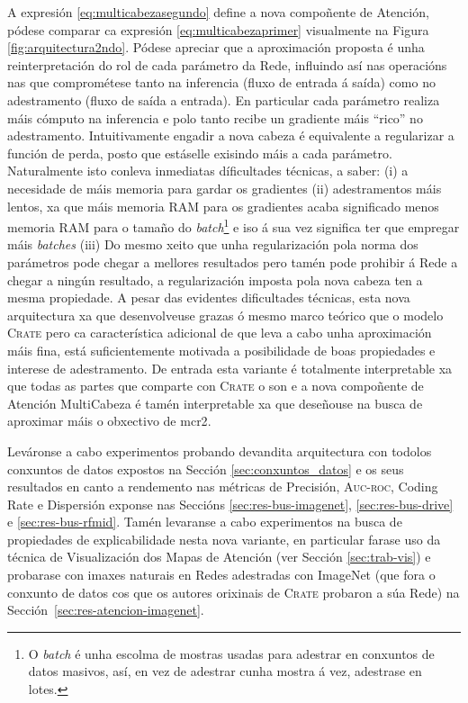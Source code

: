 A expresión \ref{eq:multicabezasegundo} define a nova compoñente de Atención, pódese comparar ca expresión \ref{eq:multicabezaprimer} visualmente na Figura \ref{fig:arquitectura2ndo}. Pódese apreciar que a aproximación proposta é unha reinterpretación do rol de cada parámetro da Rede, influindo así nas operacións nas que comprométese tanto na inferencia (fluxo de entrada á saída) como no adestramento (fluxo de saída a entrada). En particular cada parámetro realiza máis cómputo na inferencia e polo tanto recibe un gradiente máis ``rico'' no adestramento. Intuitivamente engadir a nova cabeza é equivalente a regularizar a función de perda, posto que estáselle exisindo máis a cada parámetro. Naturalmente isto conleva inmediatas díficultades técnicas, a saber: (i) a necesidade de máis memoria para gardar os gradientes (ii) adestramentos  máis lentos, xa que máis memoria RAM para os gradientes acaba significado menos memoria RAM para o tamaño do \emph{batch}\footnote{O \emph{batch} é unha escolma de mostras usadas para adestrar en conxuntos de datos masivos, así, en vez de adestrar cunha mostra á vez, adestrase en lotes.} e iso á sua vez significa ter que empregar máis \emph{batches} (iii) Do mesmo xeito que unha regularización pola norma dos parámetros pode chegar a mellores resultados pero tamén pode prohibir á Rede a chegar a ningún resultado, a regularización imposta pola nova cabeza ten a mesma propiedade. A pesar das evidentes dificultades técnicas, esta nova arquitectura xa que desenvolveuse grazas ó mesmo marco teórico que o modelo \textsc{Crate} pero ca característica adicional de que leva a cabo unha aproximación máis fina, está suficientemente motivada a posibilidade de boas propiedades e interese de adestramento. De entrada esta variante é totalmente interpretable xa que todas as partes que comparte con \textsc{Crate} o son e a nova compoñente de Atención MultiCabeza é tamén interpretable xa que deseñouse na busca de aproximar máis o obxectivo de \acrshort{mcr2}.

Leváronse a cabo experimentos probando devandita arquitectura con todolos conxuntos de datos expostos na Sección \ref{sec:conxuntos_datos} e os seus resultados en canto a rendemento nas métricas de Precisión, \textsc{Auc-roc}, Coding Rate e Dispersión exponse nas Seccións \ref{sec:res-bus-imagenet}, \ref{sec:res-bus-drive} e \ref{sec:res-bus-rfmid}. Tamén levaranse a cabo experimentos na busca de propiedades de \gls{explicabilidade} nesta nova variante, en particular farase uso da técnica de Visualización dos Mapas de Atención (ver Sección \ref{sec:trab-vis}) e probarase con imaxes naturais en Redes adestradas con ImageNet (que fora o conxunto de datos cos que os autores orixinais de \textsc{Crate} probaron a súa Rede) na Sección~\ref{sec:res-atencion-imagenet}.


